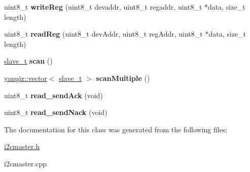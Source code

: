 \begin{DoxyCompactItemize}
\item 
\mbox{\label{classI2CMaster_a8de7eba73af26425844c8e367278067b}} 
uint8\+\_\+t {\bfseries write\+Reg} (uint8\+\_\+t devaddr, uint8\+\_\+t regaddr, uint8\+\_\+t $\ast$data, size\+\_\+t length)
\item 
\mbox{\label{classI2CMaster_aabfbdaa651c8965928f2aee51a554a86}} 
uint8\+\_\+t {\bfseries read\+Reg} (uint8\+\_\+t dev\+Addr, uint8\+\_\+t reg\+Addr, uint8\+\_\+t $\ast$data, size\+\_\+t length)
\item 
\mbox{\label{classI2CMaster_a90399cf812db2fb854b3d198e2771797}} 
\hyperlink{structslave__t}{slave\+\_\+t} {\bfseries scan} ()
\item 
\mbox{\label{classI2CMaster_a9462113b6cf72724be7bbc92becc5f45}} 
\hyperlink{classyanujz_1_1vector}{yanujz\+::vector}$<$ \hyperlink{structslave__t}{slave\+\_\+t} $>$ {\bfseries scan\+Multiple} ()
\item 
\mbox{\label{classI2CMaster_a83ef1a0c9c1e4eaa046bc97afa281f1f}} 
uint8\+\_\+t {\bfseries read\+\_\+send\+Ack} (void)
\item 
\mbox{\label{classI2CMaster_a57d0a938061fa240f144ebf0981d7e77}} 
uint8\+\_\+t {\bfseries read\+\_\+send\+Nack} (void)
\end{DoxyCompactItemize}


The documentation for this class was generated from the following files\+:\begin{DoxyCompactItemize}
\item 
\hyperlink{i2cmaster_8h}{i2cmaster.\+h}\item 
i2cmaster.\+cpp\end{DoxyCompactItemize}
